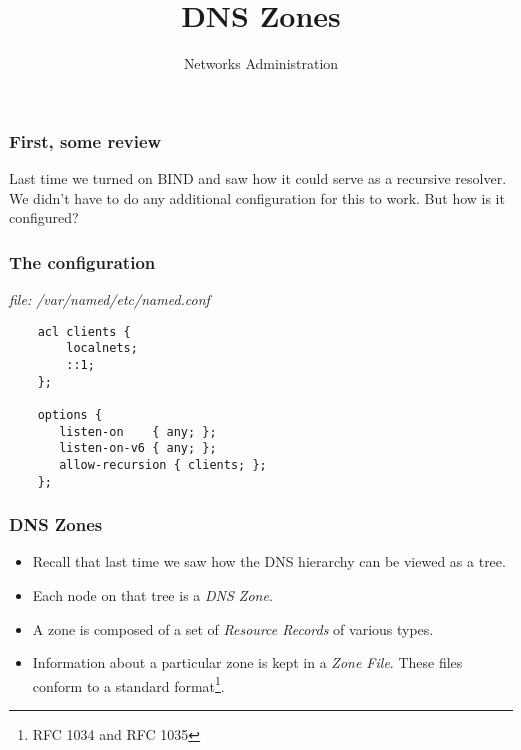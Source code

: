 \documentclass[10pt]{beamer}
\title{DNS Zones}
\author[IN715]{Networks Administration}
\institute[Otago Polytechnic]{
  Otago Polytechnic \\
  Dunedin, New Zealand \\
}
\date{}
\begin{document}
\begin{frame}[plain]
  \titlepage
\end{frame}

\begin{frame}
	\frametitle{First, some review}
	
	Last time we turned on BIND and saw how it could serve as a recursive resolver. 
	We didn't have to do any additional configuration for this to work.  But how is it configured?
	
\end{frame}

\begin{frame}[fragile]
	\frametitle{The configuration}
	
	\emph{file: /var/named/etc/named.conf}
	\begin{verbatim}
	acl clients {
	    localnets;
	    ::1;
	};
	
	options {
	   listen-on    { any; };
	   listen-on-v6 { any; };
	   allow-recursion { clients; }; 
	};
	\end{verbatim}
\end{frame}
\begin{frame}
  \frametitle{DNS Zones}

 \begin{itemize}
  \item Recall that last time we saw how the DNS hierarchy can be viewed as a tree.
  \item Each node on that tree is a \emph{DNS Zone}.
  \item A zone is composed of a set of \emph{Resource Records} of various types.
  \item Information about a particular zone is kept in a \emph{Zone File}.  These files conform to a standard format\footnote{RFC 1034 and RFC 1035}.
 \end{itemize}

\end{frame}
\end{document}
